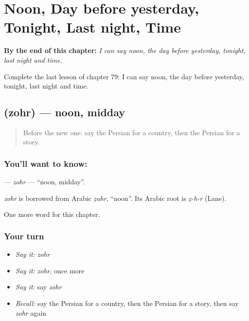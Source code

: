 
\chapter{Noon, Day before yesterday, Tonight, Last night, Time}
\label{ch:fa-noon-day-before-yesterday-tonight-last-night-time}

\begin{chapteropening}
\textbf{By the end of this chapter:} \emph{I can say noon, the day before yesterday, tonight, last night and time.}

Complete the last lesson of chapter 79: I can say noon, the day before yesterday, tonight, last night and time.
\end{chapteropening}

\section[\texorpdfstring{\fa{ظهر} (zohr)}{ظهر (zohr)}]{ (zohr) — noon, midday}

\label{lesson:FA-C79-zohr}



\begin{quote}
Before the new one: say the Persian for a country, then the Persian for a story.
\end{quote}

\subsection*{You'll want to know: }
\textbf{} — \emph{zohr} — \textquotedblleft{}noon, midday\textquotedblright{}.

\begin{cousinweb}
\emph{zohr} is borrowed from Arabic \emph{ẓuhr}, \textquotedblleft{}noon\textquotedblright{}. Its Arabic root is \emph{ẓ-h-r} (Lane).
\end{cousinweb}

\begin{grammarlens}[title={What you've built}]
One more word for this chapter.
\end{grammarlens}

\subsection*{Your turn}
\begin{itemize}
\raggedright
  \item \emph{Say it:} \emph{zohr}
  \item \emph{Say it:} \emph{zohr}, once more
  \item \emph{Say it:} say \emph{zohr}
  \item \emph{Recall:} say the Persian for a country, then the Persian for a story, then say \emph{zohr} again
\end{itemize}

